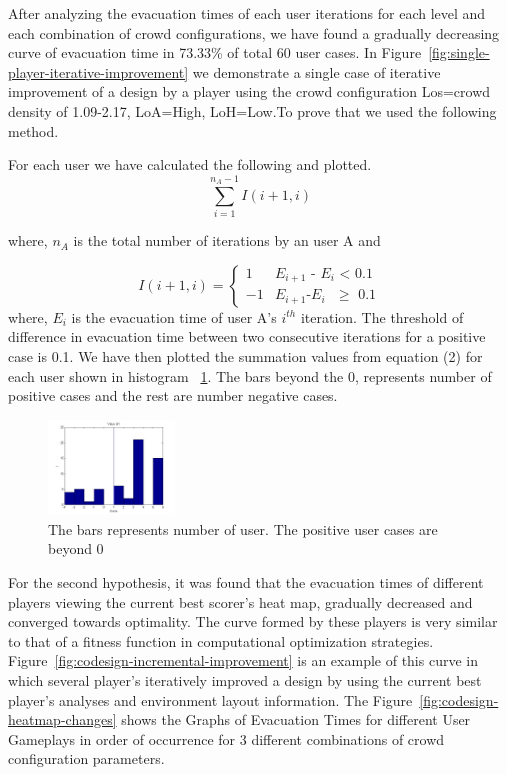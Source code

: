 After analyzing the evacuation times of each user iterations for each level and each combination of crowd configurations, we have found a gradually decreasing curve of evacuation time in 73.33\% of total 60 user cases. In Figure~\ref{fig:single-player-iterative-improvement} we demonstrate a single case of iterative improvement of a design by a player using the crowd configuration Los=crowd density of 1.09-2.17, LoA=High, LoH=Low.To prove that we used the following method.

For each user we have calculated the following and plotted.
    \begin{equation}
\sum_{i=1}^{n_{A}-1} I(i+1,i)
 \end{equation}
    
    where, $n_{A}$ is the total number of iterations by an user A and
    
    \begin{equation*}
I(i+1,i) = \begin{cases}
1 &\text{$E_{i+1}$ - $E_{i}$ < 0.1}\  \\  -1 &\text{$E_{i+1}$-$E_{i}$ $\geq$ 0.1}
\end{cases}
\end{equation*}
where, $E_{i}$ is the evacuation time of user A's $i^{th}$ iteration. The threshold of difference in evacuation time between two consecutive iterations for a positive case is 0.1. We have then plotted the summation values from equation (2) for each user shown in histogram ~\ref{fig:histogram-of- positive-use-cases}. The bars beyond the 0, represents number of positive cases and the rest are number negative cases.

\begin{figure}
\centering
	\includegraphics[width=0.3\textwidth]{images/ValueofI-Histogram.jpg} 
  \caption{\label{fig:histogram-of- positive-use-cases}The bars represents number of user. The positive user cases are beyond 0}
\end{figure}


For the second hypothesis, it was found that the evacuation times of different players viewing the current best scorer's heat map, gradually decreased and converged towards optimality. The curve formed by these players is very similar to that of a fitness function in computational optimization strategies. Figure~\ref{fig:codesign-incremental-improvement} is an example of this curve in which several player's iteratively improved a design by using the current best player's analyses and environment layout information. The Figure~\ref{fig:codesign-heatmap-changes} shows the Graphs of Evacuation Times for different User Gameplays in order of occurrence for 3 different combinations of crowd configuration parameters. 



